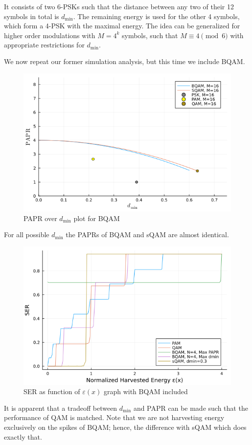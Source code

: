 \documentclass[11pt,a4paper,onecolumn,final]{article}
\newcommand{\dmin}{d_\text{min}}
\newcommand{\eps}{\varepsilon}
\begin{document}
It consists of two 6-PSKs such that the distance between any two of their 12 symbols in total is \(\dmin\). The remaining energy is used for the other 4 symbols, which form a 4-PSK with the maximal energy. The idea can be generalized for higher order modulations with \(M = 4^k\) symbols, such that \(M \equiv 4 \pmod 6\) with appropriate restrictions for \(\dmin\). 

We now repeat our former simulation analysis, but this time we include BQAM. 
\begin{figure}[h]
    \centering
    \includegraphics[scale=0.55]{bqam_papr_dmin.png}
    \caption{PAPR over \(\dmin\) plot for BQAM}
\end{figure}

For all possible \(\dmin\) the PAPRs of BQAM and sQAM are almost identical. 

\begin{figure}[h]
    \centering
    \includegraphics[scale=0.58]{bqam_ex2_a.png}
    \caption{SER as function of \(\eps(x)\) graph with BQAM included}
\end{figure}
It is apparent that a tradeoff between \(\dmin \) and PAPR can be made such that the performance of QAM is matched. Note that we are not harvesting energy exclusively on the spikes of BQAM; hence, the difference with sQAM which does exactly that. 
\end{document}
